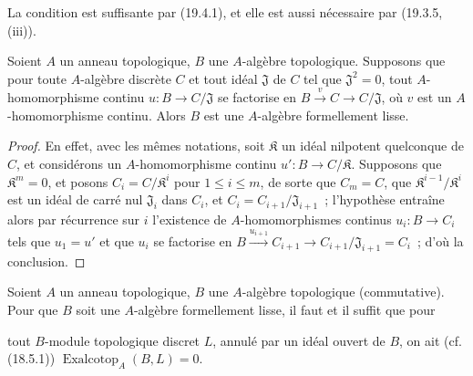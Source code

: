 La condition est suffisante par (19.4.1), et elle est aussi nécessaire par
(19.3.5, (iii)).

\begin{proposition}[19.4.3]
\label{0.19.4.3-fr}
Soient $A$ un anneau topologique, $B$ une $A$-algèbre topologique. Supposons
que pour toute $A$-algèbre discrète $C$ et tout idéal $\mathfrak J$ de $C$
tel que $\mathfrak J^2=0$, tout $A$-homomorphisme continu
$u:B\to C/\mathfrak J$ se factorise en
$B\xrightarrow{v}C\to C/\mathfrak J$, où $v$ est un $A$-homomorphisme
continu. Alors $B$ est une $A$-algèbre formellement lisse.
\end{proposition}

\begin{proof}
En effet, avec les mêmes notations, soit $\mathfrak K$ un idéal nilpotent
quelconque de $C$, et considérons un $A$-homomorphisme continu
$u':B\to C/\mathfrak K$. Supposons que $\mathfrak K^m=0$, et posons
$C_i=C/\mathfrak K^i$ pour $1\leq i\leq m$, de sorte que $C_m=C$, que
$\mathfrak K^{i-1}/\mathfrak K^i$ est un idéal de carré nul
$\mathfrak J_i$ dans $C_i$, et $C_i=C_{i+1}/\mathfrak J_{i+1}$~;
l'hypothèse entraîne alors par récurrence sur $i$ l'existence de
$A$-homomorphismes continus $u_i:B\to C_i$ tels que $u_1=u'$ et que $u_i$
se factorise en
$B\xrightarrow{u_{i+1}}C_{i+1}\to C_{i+1}/\mathfrak J_{i+1}=C_i$~;
d'où la conclusion.
\end{proof}

\begin{proposition}[19.4.4]
\label{0.19.4.4-fr}
Soient $A$ un anneau topologique, $B$ une $A$-algèbre topologique
(commutative). Pour que $B$ soit une $A$-algèbre formellement lisse, il faut et
il suffit que pour


tout $B$-module topologique discret $L$, annulé par un idéal ouvert de $B$, on
ait \textup{(cf. (18.5.1))}
$\operatorname{Exalcotop}_A(B,L)=0$.
\end{proposition}

